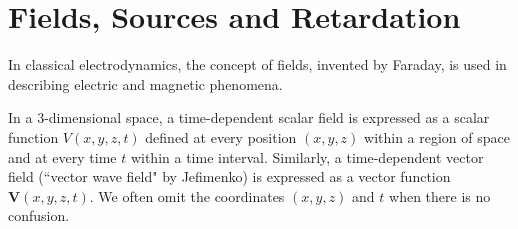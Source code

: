 \documentclass[11pt]{article}              %
\begin{document}






\section{Fields, Sources and Retardation}
In classical electrodynamics, the concept of fields, invented by Faraday, is used in describing electric and magnetic phenomena. 

In a 3-dimensional space, a time-dependent scalar field is expressed as a scalar function $V(x,y,z,t)$ defined at every position $(x,y,z)$ within a region of space and at every time $t$ within a time interval. Similarly, a time-dependent vector field (``vector wave field" by Jefimenko) is expressed as a vector function ${\mathbf V}(x,y,z,t)$. We often omit the coordinates $(x,y,z)$ and $t$ when there is no confusion.
\end{document}
